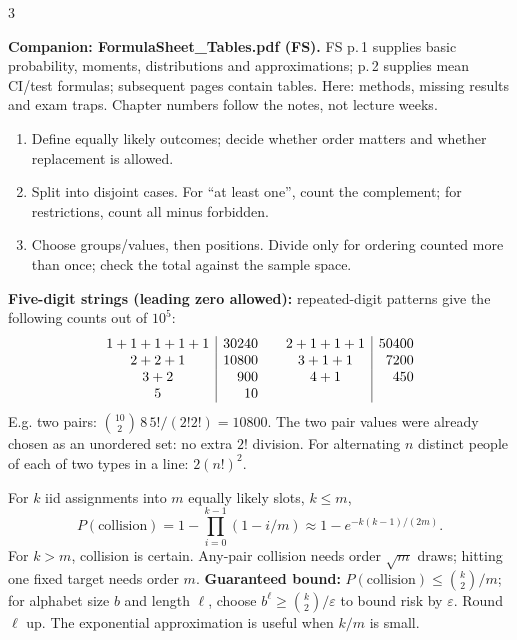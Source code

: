 \documentclass[10pt]{article}
\newcommand{\boxstart}[1]{\begin{tcolorbox}[title={#1},sharp corners]}
\newcommand{\boxend}{\end{tcolorbox}}
\begin{document}
\small
\setlength{\abovedisplayskip}{1pt}
\setlength{\belowdisplayskip}{1pt}
\setlength{\abovedisplayshortskip}{0pt}
\setlength{\belowdisplayshortskip}{0pt}

\begin{multicols*}{3}
\vspace*{-1em}
\boxstart{ST2334 Finals --- Ch. 1--4: Probability}
\textbf{Companion: FormulaSheet\_Tables.pdf (FS).} FS p.\,1 supplies basic probability, moments, distributions and approximations; p.\,2 supplies mean CI/test formulas; subsequent pages contain tables. Here: methods, missing results and exam traps. Chapter numbers follow the notes, not lecture weeks.
\boxend

\boxstart{Ch. 1 --- Counting: set up before calculating}
\begin{enumerate}
\item Define equally likely outcomes; decide whether order matters and whether replacement is allowed.
\item Split into disjoint cases. For ``at least one'', count the complement; for restrictions, count all minus forbidden.
\item Choose groups/values, then positions. Divide only for ordering counted more than once; check the total against the sample space.
\end{enumerate}
\textbf{Five-digit strings (leading zero allowed):} repeated-digit patterns give the following counts out of $10^5$:
\[
\begin{array}{c|r@{\qquad}c|r}
1+1+1+1+1&30240&2+1+1+1&50400\\
2+2+1&10800&3+1+1&7200\\
3+2&900&4+1&450\\
5&10&&
\end{array}
\]
E.g. two pairs: $\binom{10}{2}\,8\,5!/(2!2!)=10800$. The two pair values were already chosen as an unordered set: no extra $2!$ division. For alternating $n$ distinct people of each of two types in a line: $2(n!)^2$.
\boxend

\boxstart{Ch. 1 --- Collisions and identifier length}
For $k$ iid assignments into $m$ equally likely slots, $k\le m$,
\[
P(\text{collision})=1-\prod_{i=0}^{k-1}(1-i/m)
\approx1-e^{-k(k-1)/(2m)}.
\]
For $k>m$, collision is certain. Any-pair collision needs order $\sqrt m$ draws; hitting one fixed target needs order $m$.
\textbf{Guaranteed bound:} $P(\text{collision})\le\binom{k}{2}/m$; for alphabet size $b$ and length $\ell$, choose $b^\ell\ge\binom{k}{2}/\varepsilon$ to bound risk by $\varepsilon$. Round $\ell$ up. The exponential approximation is useful when $k/m$ is small.
\boxend


\end{multicols*}
\end{document}
